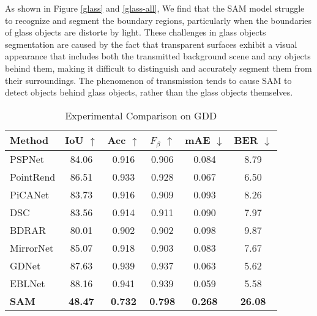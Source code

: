 \documentclass{article}
\begin{document}
As shown in Figure \ref{glass} and \ref{glass-all}, We find that the SAM model struggle to recognize and segment the boundary regions, particularly when the boundaries of glass objects are distorte by light. These challenges in glass objects segmentation are caused by the fact that transparent surfaces exhibit a visual appearance that includes both the transmitted background scene and any objects behind them, making it difficult to distinguish and accurately segment them from their surroundings. The phenomenon of transmission tends to cause SAM to detect objects behind glass objects, rather than the glass objects themselves.

\begin{table}%
    \centering
    \begin{tabular}{lccccc} %
    \toprule
    Method & IoU $\uparrow$ & Acc $\uparrow$ &${F}_{\beta}$ $\uparrow$ & mAE $\downarrow$ &BER $\downarrow$ \\
    \midrule
    PSPNet \cite{zhao2017pyramid}    &84.06 &0.916 &0.906& 0.084 &8.79\\
    
    PointRend \cite{kirillov2020pointrend}  & 86.51 &0.933&0.928 & 0.067& 6.50\\
    PiCANet \cite{liu2018picanet}   &83.73 &0.916&0.909 & 0.093 &8.26\\
    DSC \cite{hu2018direction} &83.56 & 0.914  &0.911   & 0.090 & 7.97\\
    BDRAR \cite{zhu2018bidirectional}  &80.01 & 0.902 &0.902    & 0.098 & 9.87\\
    MirrorNet \cite{yang2019my} &85.07 & 0.918 &0.903    & 0.083 & 7.67\\
    GDNet \cite{mei2020don}  &87.63 & 0.939 &0.937 & 0.063 & 5.62\\
    EBLNet \cite{he2021enhanced}  & 88.16 & 0.941  &0.939   & 0.059 & 5.58\\
    \midrule
    \textbf{SAM}& \textbf{48.47} &\textbf{0.732} &\textbf{0.798}&\textbf{ 0.268} & \textbf{26.08}\\
    \bottomrule
    \end{tabular}
    \caption{Experimental Comparison on GDD}
    \label{GDD}
\end{table}
\end{document}
